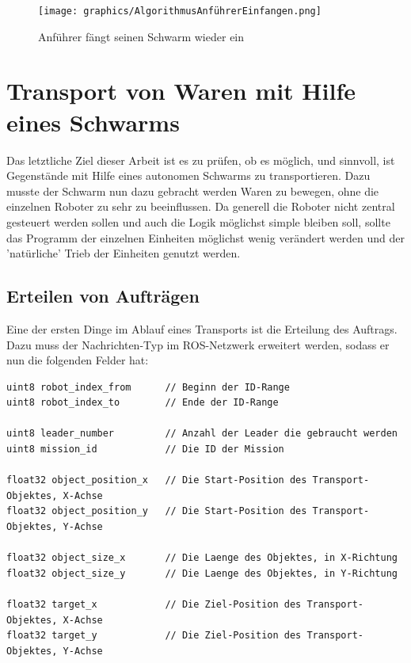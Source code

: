 \begin{figure}
	\texttt{[image: graphics/AlgorithmusAnführerEinfangen.png]}
	\caption{Anführer fängt seinen Schwarm wieder ein}
	\label{pic:AnführerEinfangen}
\end{figure}








\section{Transport von Waren mit Hilfe eines Schwarms}

Das letztliche Ziel dieser Arbeit ist es zu prüfen, ob es möglich, und sinnvoll, ist Gegenstände mit Hilfe eines autonomen Schwarms zu transportieren. Dazu musste der Schwarm nun dazu gebracht werden Waren zu bewegen, ohne die einzelnen Roboter zu sehr zu beeinflussen. Da generell die Roboter nicht zentral gesteuert werden sollen und auch die Logik möglichst simple bleiben soll, sollte das Programm der einzelnen Einheiten möglichst wenig verändert werden und der 'natürliche' Trieb der Einheiten genutzt werden.

\subsection*{Erteilen von Aufträgen}

Eine der ersten Dinge im Ablauf eines Transports ist die Erteilung des Auftrags. Dazu muss der Nachrichten-Typ  im ROS-Netzwerk erweitert werden, sodass er nun die folgenden Felder hat:

\begin{lstlisting}[style=ros]
uint8 robot_index_from		// Beginn der ID-Range
uint8 robot_index_to		// Ende der ID-Range

uint8 leader_number			// Anzahl der Leader die gebraucht werden
uint8 mission_id			// Die ID der Mission

float32 object_position_x	// Die Start-Position des Transport-Objektes, X-Achse
float32 object_position_y	// Die Start-Position des Transport-Objektes, Y-Achse

float32 object_size_x		// Die Laenge des Objektes, in X-Richtung
float32 object_size_y		// Die Laenge des Objektes, in Y-Richtung

float32 target_x			// Die Ziel-Position des Transport-Objektes, X-Achse
float32 target_y			// Die Ziel-Position des Transport-Objektes, Y-Achse
\end{lstlisting}

